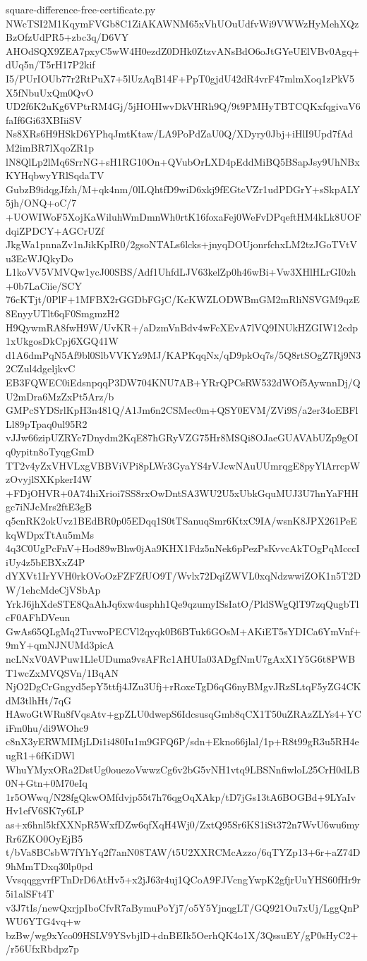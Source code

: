 \documentclass[11pt]{article}
\theoremstyle{definition}
\theoremstyle{remark}
\begin{document}
\begin{filecontents*}[overwrite]{square-difference-free-certificate.py}
NWcTSI2M1KqymFVGb8C1ZiAKAWNM65xVhUOuUdfvWi9VWWzHyMehXQzBzOfzUdPR5+zbc3q/D6VY
AHOdSQX9ZEA7pxyC5wW4H0ezdZ0DHk0ZtzvANsBdO6oJtGYeUElVBv0Agq+dUq5n/T5rH17P2kif
I5/PUrIOUb77r2RtPuX7+5lUzAqB14F+PpT0gjdU42dR4vrF47mlmXoq1zPkV5X5fNbuUxQm0QvO
UD2f6K2uKg6VPtrRM4Gj/5jHOHIwvDkVHRh9Q/9t9PMHyTBTCQKxfqgivaV6faIf6Gi63XBIiiSV
Ns8XRs6H9HSkD6YPhqJmtKtaw/LA9PoPdZaU0Q/XDyry0Jbj+iHlI9Upd7fAdM2imBR7lXqoZR1p
lN8QlLp2lMq6SrrNG+sH1RG10On+QVubOrLXD4pEddMiBQ5BSapJsy9UhNBxKYHqbwyYRlSqdaTV
GubzB9idqgJfzh/M+qk4nm/0lLQhtfD9wiD6xkj9fEGtcVZr1udPDGrY+sSkpALY5jh/ONQ+oC/7
+UOWIWoF5XojKaWiluhWmDmnWh0rtK16foxaFej0WeFvDPqeftHM4kLk8UOFdqiZPDCY+AGCrUZf
JkgWa1pnnaZv1nJikKpIR0/2gsoNTALs6lcks+jnyqDOUjonrfchxLM2tzJGoTVtVu3EcWJQkyDo
L1koVV5VMVQw1ycJ00SBS/Adf1UhfdLJV63kelZp0h46wBi+Vw3XHlHLrGI0zh+0b7LaCiie/SCY
76cKTjt/0PlF+1MFBX2rGGDbFGjC/KcKWZLODWBmGM2mRliNSVGM9qzE8EnyyUTlt6qF0SmgmzH2
H9QywmRA8fwH9W/UvKR+/aDzmVnBdv4wFcXEvA7lVQ9INUkHZGIW12cdp1xUkgosDkCpj6XGQ41W
d1A6dmPqN5Af9bl0SlbVVKYz9MJ/KAPKqqNx/qD9pkOq7s/5Q8rtSOgZ7Rj9N32CZul4dgeljkvC
EB3FQWEC0iEdsnpqqP3DW704KNU7AB+YRrQPCsRW532dWOf5AywnnDj/QU2mDra6MzZxPt5Arz/b
GMPcSYDSrlKpH3n481Q/A1Jm6n2CSMec0m+QSY0EVM/ZVi9S/a2er34oEBFlLl89pTpaq0ul95R2
vJJw66zipUZRYc7Dnydm2KqE87hGRyVZG75Hr8MSQi8OJaeGUAVAbUZp9gOIq0ypitn8oTyqgGmD
TT2v4yZxVHVLxgVBBViVPi8pLWr3GyaYS4rVJcwNAuUUmrqgE8pyYlArrcpWzOvyjlSXKpkerI4W
+FDjOHVR+0A74hiXrioi7SS8rxOwDntSA3WU2U5xUbkGquMUJ3U7hnYaFHHgc7iNJcMrs2ftE3gB
q5cnRK2okUvz1BEdBR0p05EDqq1S0tTSanuqSmr6KtxC9IA/wsnK8JPX261PeEkqWDpxTtAu5mMs
4q3C0UgPcFnV+Hod89wBhw0jAa9KHX1Fdz5nNek6pPezPsKvvcAkTOgPqMcccIiUy4z5bEBXxZ4P
dYXVt1IrYVH0rkOVoOzFZFZfUO9T/Wvlx72DqiZWVL0xqNdzwwiZOK1n5T2DW/1ehcMdeCjVSbAp
YrkJ6jhXdeSTE8QaAhJq6xw4usphh1Qe9qzumyISsIatO/PldSWgQlT97zqQugbTlcF0AFhDVeun
GwAs65QLgMq2TuvwoPECVl2qyqk0B6BTuk6GOsM+AKiET5sYDICa6YmVnf+9mY+qmNJNUMd3picA
ncLNxV0AVPuw1LleUDuma9vsAFRc1AHUIa03ADgfNmU7gAxX1Y5G6t8PWBT1wcZxMVQSVn/1BqAN
NjO2DgCrGngyd5epY5ttfj4JZu3Ufj+rRoxeTgD6qG6nyBMgvJRzSLtqF5yZG4CKdM3tlhHt/7qG
HAwoGtWRu8fVqsAtv+gpZLU0dwepS6IdcsusqGmb8qCX1T50uZRAzZLYs4+YCiFm0hu/di9WOhc9
c8nX3yERWMIMjLDi1i480Iu1m9GFQ6P/sdn+Ekno66jlal/1p+R8t99gR3u5RH4eugR1+6fKiDWl
WhuYMyxORa2DstUg0ouezoVwwzCg6v2bG5vNH1vtq9LBSNnfiwloL25CrH0dLB0N+Gtn+0M70eIq
1r5OWwq/N28fgQkwOMfdvjp55t7h76qgOqXAkp/tD7jGs13tA6BOGBd+9LYaIvHv1efV6SK7y6LP
as+x6hnl5kfXXNpR5WxfDZw6qfXqH4Wj0/ZxtQ95Sr6KS1iSt372n7WvU6wu6myRr6ZKO0OyEjB5
t/bVa8BCsbW7fYhYq2f7anN08TAW/t5U2XXRCMcAzzo/6qTYZp13+6r+aZ74D9hMmTDxq30lp0pd
VvsqqggvrfFTnDrD6AtHv5+x2jJ63r4uj1QCoA9FJVcngYwpK2gfjrUuYHS60fHr9r5i1alSFt4T
v3J7tIs/newQxrjpIboCfvR7aBymuPoYj7/o5Y5YjnqgLT/GQ921Ou7xUj/LggQnPWU6YTG4vq+w
bzBw/wg9xYco09HSLV9YSvbjlD+dnBEIk5OerhQK4o1X/3QssuEY/gP0sHyC2+/r56UfxRbdpz7p

\end{filecontents*}
\end{document}

